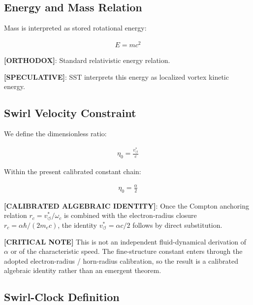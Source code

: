 \documentclass[11pt]{article}
\theoremstyle{definition}
\theoremstyle{plain}
\theoremstyle{remark}
\newcommand{\rc}{{r_c}}
\newcommand{\vchar}{v_{\!\boldsymbol{\circlearrowleft}}^{\ast}}
\begin{document}
    \subsection{Energy and Mass Relation}
        
        Mass is interpreted as stored rotational energy:
        
        \begin{align}
            E = m c^2
        \end{align}
        
        \textbf{[ORTHODOX]}: Standard relativistic energy relation.
        
        \textbf{[SPECULATIVE]}: SST interprets this energy as localized vortex kinetic energy.
    
    \subsection{Swirl Velocity Constraint}
        
        We define the dimensionless ratio:
        
        \begin{align}
            \eta_0 = \frac{\vchar}{c}
        \end{align}
        
        Within the present calibrated constant chain:
        
        \begin{align}
            \eta_0 = \frac{\alpha}{2}
        \end{align}
        
        \textbf{[CALIBRATED ALGEBRAIC IDENTITY]}: Once the Compton anchoring relation $\rc=\vchar/\omega_c$ is combined with the electron-radius closure $\rc=\alpha\hbar/(2m_ec)$, the identity $\vchar=\alpha c/2$ follows by direct substitution.

        \textbf{[CRITICAL NOTE]} This is not an independent fluid-dynamical derivation of $\alpha$ or of the characteristic speed. The fine-structure constant enters through the adopted electron-radius / horn-radius calibration, so the result is a calibrated algebraic identity rather than an emergent theorem.
    
    \subsection{Swirl-Clock Definition}
        \label{subsec:swirl_clock_definition}
\end{document}
